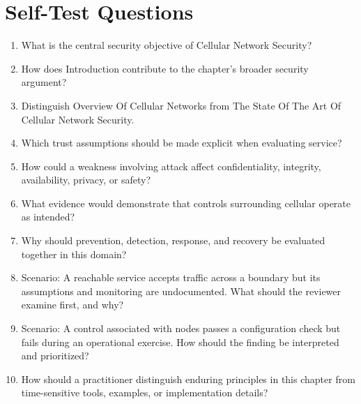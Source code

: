 \documentclass[11pt]{article}
\begin{document}
\section*{Self-Test Questions}
\begin{enumerate}
\item What is the central security objective of Cellular Network Security?
\item How does Introduction contribute to the chapter's broader security argument?
\item Distinguish Overview Of Cellular Networks from The State Of The Art Of Cellular Network Security.
\item Which trust assumptions should be made explicit when evaluating service?
\item How could a weakness involving attack affect confidentiality, integrity, availability, privacy, or safety?
\item What evidence would demonstrate that controls surrounding cellular operate as intended?
\item Why should prevention, detection, response, and recovery be evaluated together in this domain?
\item Scenario: A reachable service accepts traffic across a boundary but its assumptions and monitoring are undocumented. What should the reviewer examine first, and why?
\item Scenario: A control associated with nodes passes a configuration check but fails during an operational exercise. How should the finding be interpreted and prioritized?
\item How should a practitioner distinguish enduring principles in this chapter from time-sensitive tools, examples, or implementation details?
\end{enumerate}
\end{document}

